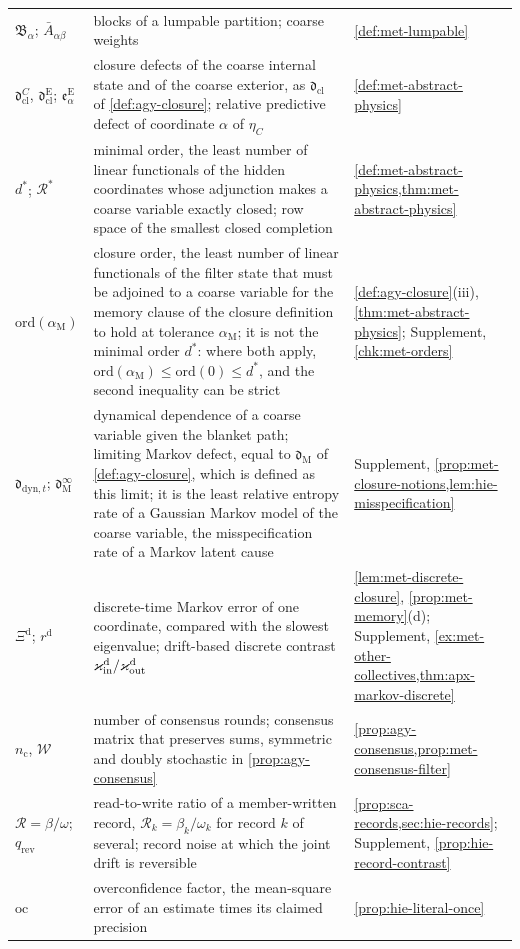 \begin{longtable}{@{}>{\raggedright\arraybackslash}p{}>{\raggedright\arraybackslash}p{}>{\raggedright\arraybackslash}p{}@{}}
$\mathfrak B_\alpha$; $\bar A_{\alpha\beta}$ & blocks of a lumpable partition; coarse weights & \cref{def:met-lumpable}\\
$\mathfrak d^C_{\mathrm{cl}}$, $\mathfrak d^{\mathrm E}_{\mathrm{cl}}$; $\mathfrak e^{\mathrm E}_\alpha$ & closure defects of the coarse internal state and of the coarse exterior, as $\mathfrak d_{\mathrm{cl}}$ of \cref{def:agy-closure}; relative predictive defect of coordinate $\alpha$ of $\eta_C$ & \cref{def:met-abstract-physics}\\
$d^\ast$; $\mathcal R^\ast$ & minimal order, the least number of linear functionals of the hidden coordinates whose adjunction makes a coarse variable exactly closed; row space of the smallest closed completion & \cref{def:met-abstract-physics,thm:met-abstract-physics}\\
$\mathrm{ord}(\alpha_{\mathrm M})$ & closure order, the least number of linear functionals of the filter state that must be adjoined to a coarse variable for the memory clause of the closure definition to hold at tolerance $\alpha_{\mathrm M}$; it is not the minimal order $d^\ast$: where both apply, $\mathrm{ord}(\alpha_{\mathrm M})\le\mathrm{ord}(0)\le d^\ast$, and the second inequality can be strict & \cref{def:agy-closure}(iii), \cref{thm:met-abstract-physics}; Supplement, \cref{chk:met-orders}\\
$\mathfrak d_{\mathrm{dyn},t}$; $\mathfrak d^\infty_{\mathrm M}$ & dynamical dependence of a coarse variable given the blanket path; limiting Markov defect, equal to $\mathfrak d_{\mathrm M}$ of \cref{def:agy-closure}, which is defined as this limit; it is the least relative entropy rate of a Gaussian Markov model of the coarse variable, the misspecification rate of a Markov latent cause & Supplement, \cref{prop:met-closure-notions,lem:hie-misspecification}\\
$\Xi^{\mathrm d}$; $r^{\mathrm d}$ & discrete-time Markov error of one coordinate, compared with the slowest eigenvalue; drift-based discrete contrast $\varkappa_{\mathrm{in}}^{\mathrm d}/\varkappa_{\mathrm{out}}^{\mathrm d}$ & \cref{lem:met-discrete-closure}, \cref{prop:met-memory}(d); Supplement, \cref{ex:met-other-collectives,thm:apx-markov-discrete}\\
$n_{\mathrm c}$, $\mathcal W$ & number of consensus rounds; consensus matrix that preserves sums, symmetric and doubly stochastic in \cref{prop:agy-consensus} & \cref{prop:agy-consensus,prop:met-consensus-filter}\\
$\mathcal R=\beta/\omega$; $q_{\mathrm{rev}}$ & read-to-write ratio of a member-written record, $\mathcal R_k=\beta_k/\omega_k$ for record $k$ of several; record noise at which the joint drift is reversible & \cref{prop:sca-records,sec:hie-records}; Supplement, \cref{prop:hie-record-contrast}\\
$\mathrm{oc}$ & overconfidence factor, the mean-square error of an estimate times its claimed precision & \cref{prop:hie-literal-once}\\
\end{longtable}
\endgroup

